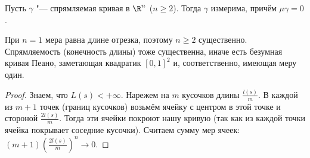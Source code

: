 \begin{lemma}
	Пусть $\gamma$ "--- спрямляемая кривая в $\R^n$ ($n \ge 2$).
	Тогда $\gamma$ измерима, причём $\mu \gamma = 0$.
\end{lemma}
\begin{Rem}
	При $n=1$ мера равна длине отрезка, поэтому $n \ge 2$ существенно.
	Спрямляемость (конечность длины) тоже существенна, иначе есть безумная кривая Пеано, заметающая квадратик $[0,1]^2$ и, соответственно, имеющая меру один.
\end{Rem}
\begin{proof}
	Знаем, что $L(s) < +\infty$.
	Нарежем на $m$ кусочков длины $\frac{l(s)}{m}$.
	В каждой из $m+1$ точек (границ кусочков) возьмём ячейку с центром в этой точке и стороной $\frac{2l(s)}{m}$.
	Тогда эти ячейки покроют нашу кривую (так как из каждой точки ячейка покрывает соседние кусочки).
	Считаем сумму мер ячеек: $(m+1)\left(\frac{2l(s)}{m}\right)^n \to 0$.
\end{proof}
